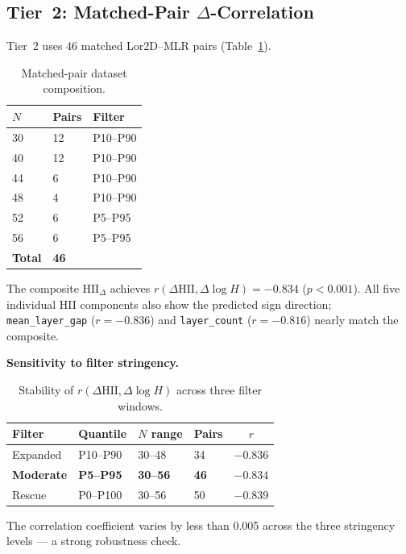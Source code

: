 \documentclass[entropy,article,submit,pdftex,moreauthors]{Definitions/mdpi}
\begin{document}
\subsection{Tier~2: Matched-Pair $\Delta$-Correlation}

Tier~2 uses 46 matched Lor2D--MLR pairs (Table~\ref{tab:tier2_pairs}).

\begin{table}[H]
\caption{Matched-pair dataset composition.\label{tab:tier2_pairs}}
\begin{tabular}{lll}
\toprule
\boldmath$N$ & \textbf{Pairs} & \textbf{Filter} \\
\midrule
30 & 12 & P10--P90 \\
40 & 12 & P10--P90 \\
44 & 6 & P10--P90 \\
48 & 4 & P10--P90 \\
52 & 6 & P5--P95 \\
56 & 6 & P5--P95 \\
\midrule
\textbf{Total} & \textbf{46} & \\
\bottomrule
\end{tabular}
\end{table}

The composite $\text{HII}_\Delta$ achieves $r(\Delta\text{HII}, \Delta\log H) = -0.834$ ($p < 0.001$). All five individual HII components also show the predicted sign direction; \texttt{mean\_layer\_gap} ($r = -0.836$) and \texttt{layer\_count} ($r = -0.816$) nearly match the composite.

\textbf{Sensitivity to filter stringency.}

\begin{table}[H]
\caption{Stability of $r(\Delta\text{HII}, \Delta\log H)$ across three filter windows.\label{tab:sensitivity}}
\begin{tabular}{llllc}
\toprule
\textbf{Filter} & \textbf{Quantile} & \boldmath$N$ \textbf{range} & \textbf{Pairs} & \boldmath$r$ \\
\midrule
Expanded & P10--P90 & 30--48 & 34 & $-0.836$ \\
\textbf{Moderate} & \textbf{P5--P95} & \textbf{30--56} & \textbf{46} & $\mathbf{-0.834}$ \\
Rescue & P0--P100 & 30--56 & 50 & $-0.839$ \\
\bottomrule
\end{tabular}
\end{table}

The correlation coefficient varies by less than 0.005 across the three stringency levels --- a strong robustness check.
\end{document}
